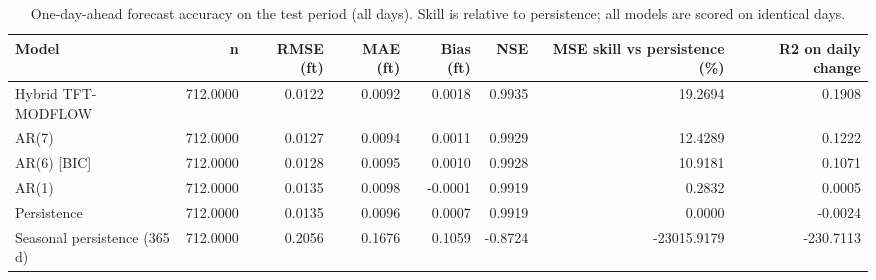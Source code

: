 \begin{table}[htbp]
\centering
\caption{One-day-ahead forecast accuracy on the test period (all days). Skill is relative to persistence; all models are scored on identical days.}
\label{tab:benchmarks_test_all_days}
\begin{tabular}{lrrrrrrr}
\hline
Model & n & RMSE (ft) & MAE (ft) & Bias (ft) & NSE & MSE skill vs persistence (\%) & R2 on daily change \\
\hline
Hybrid TFT-MODFLOW & 712.0000 & 0.0122 & 0.0092 & 0.0018 & 0.9935 & 19.2694 & 0.1908 \\
AR(7) & 712.0000 & 0.0127 & 0.0094 & 0.0011 & 0.9929 & 12.4289 & 0.1222 \\
AR(6) [BIC] & 712.0000 & 0.0128 & 0.0095 & 0.0010 & 0.9928 & 10.9181 & 0.1071 \\
AR(1) & 712.0000 & 0.0135 & 0.0098 & -0.0001 & 0.9919 & 0.2832 & 0.0005 \\
Persistence & 712.0000 & 0.0135 & 0.0096 & 0.0007 & 0.9919 & 0.0000 & -0.0024 \\
Seasonal persistence (365 d) & 712.0000 & 0.2056 & 0.1676 & 0.1059 & -0.8724 & -23015.9179 & -230.7113 \\
\hline
\end{tabular}
\end{table}